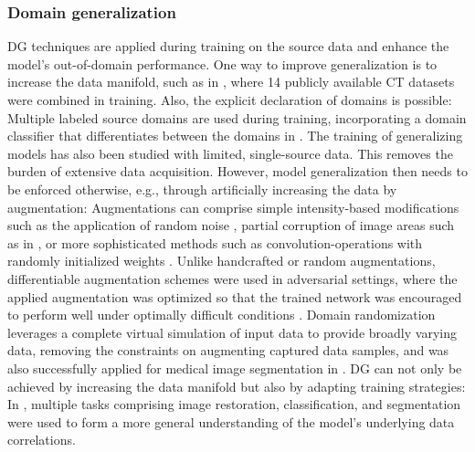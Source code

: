         \subsubsection{Domain generalization} %
        DG techniques are applied during training on the source data and enhance the model’s out-of-domain performance. One way to improve generalization is to increase the data manifold, such as in \citep{liu2023clip}, where 14 publicly available CT datasets were combined in training. Also, the explicit declaration of domains is possible: Multiple labeled source domains are used during training, incorporating a domain classifier that differentiates between the domains in  \citep{hu2022domain}.
        The training of generalizing models has also been studied with limited, single-source data. This removes the burden of extensive data acquisition. However, model generalization then needs to be enforced otherwise, e.g., through artificially increasing the data by augmentation:
        Augmentations can comprise simple intensity-based modifications such as the application of random noise \citep{zhou2022domain}, partial corruption of image areas such as in \citep{devries2017improved,he2022masked,hoyer2023mic},
        or more sophisticated methods such as convolution-operations with randomly initialized weights  \citep{xu2020robust,ouyang2022causality}.
        Unlike handcrafted or random augmentations, differentiable augmentation schemes were used in adversarial settings, where the applied augmentation was optimized so that the trained network was encouraged to perform well under optimally difficult conditions \citep{zhou2020deep, hu2022domain}.
        Domain randomization \citep{tobin2017domain} leverages a complete virtual simulation of input data to provide broadly varying data, removing the constraints on augmenting captured data samples, and was also successfully applied for medical image segmentation in \citep{billot2023synthseg}.
        DG can not only be achieved by increasing the data manifold but also by adapting training strategies: In \citep{bucci2021self, zhou2021models}, multiple tasks comprising image restoration, classification, and segmentation were used to form a more general understanding of the model’s underlying data correlations.

